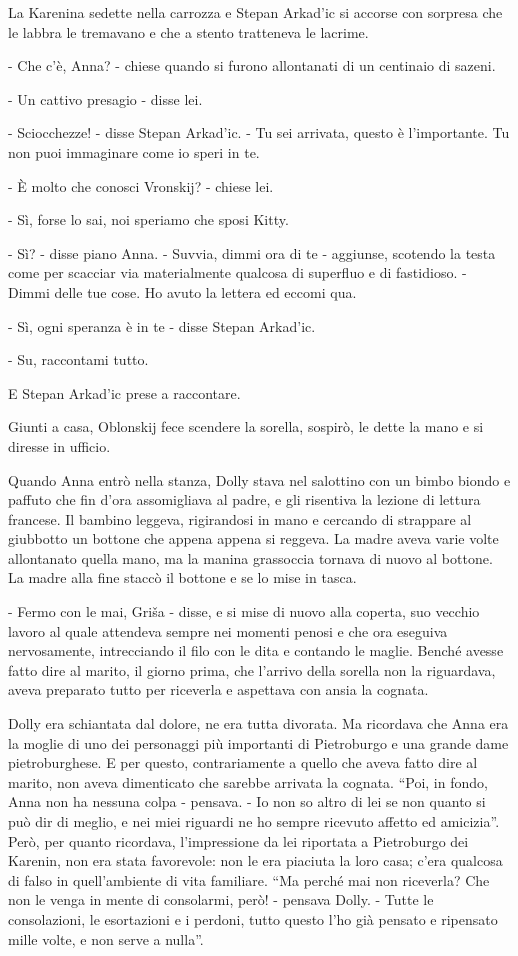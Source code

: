 La Karenina sedette nella carrozza e Stepan Arkad'ic si accorse con sorpresa che le labbra le tremavano e che a stento tratteneva le lacrime. 

- Che c'è, Anna? - chiese quando si furono allontanati di un centinaio di sazeni. 

- Un cattivo presagio - disse lei. 

- Sciocchezze! - disse Stepan Arkad'ic. - Tu sei arrivata, questo è l'importante. Tu non puoi immaginare come io speri in te. 

- È molto che conosci Vronskij? - chiese lei. 

- Sì, forse lo sai, noi speriamo che sposi Kitty. 

- Sì? - disse piano Anna. - Suvvia, dimmi ora di te - aggiunse, scotendo la testa come per scacciar via materialmente qualcosa di superfluo e di fastidioso. - Dimmi delle tue cose. Ho avuto la lettera ed eccomi qua. 

- Sì, ogni speranza è in te - disse Stepan Arkad'ic. 

- Su, raccontami tutto. 

E Stepan Arkad'ic prese a raccontare. 

Giunti a casa, Oblonskij fece scendere la sorella, sospirò, le dette la mano e si diresse in ufficio. 

\label{xix} 

Quando Anna entrò nella stanza, Dolly stava nel salottino con un bimbo biondo e paffuto che fin d'ora assomigliava al padre, e gli risentiva la lezione di lettura francese. Il bambino leggeva, rigirandosi in mano e cercando di strappare al giubbotto un bottone che appena appena si reggeva. La madre aveva varie volte allontanato quella mano, ma la manina grassoccia tornava di nuovo al bottone. La madre alla fine staccò il bottone e se lo mise in tasca. 

- Fermo con le mai, Griša - disse, e si mise di nuovo alla coperta, suo vecchio lavoro al quale attendeva sempre nei momenti penosi e che ora eseguiva nervosamente, intrecciando il filo con le dita e contando le maglie. Benché avesse fatto dire al marito, il giorno prima, che l'arrivo della sorella non la riguardava, aveva preparato tutto per riceverla e aspettava con ansia la cognata. 

Dolly era schiantata dal dolore, ne era tutta divorata. Ma ricordava che Anna era la moglie di uno dei personaggi più importanti di Pietroburgo e una grande dame pietroburghese. E per questo, contrariamente a quello che aveva fatto dire al marito, non aveva dimenticato che sarebbe arrivata la cognata. ``Poi, in fondo, Anna non ha nessuna colpa - pensava. - Io non so altro di lei se non quanto si può dir di meglio, e nei miei riguardi ne ho sempre ricevuto affetto ed amicizia''. Però, per quanto ricordava, l'impressione da lei riportata a Pietroburgo dei Karenin, non era stata favorevole: non le era piaciuta la loro casa; c'era qualcosa di falso in quell'ambiente di vita familiare. ``Ma perché mai non riceverla? Che non le venga in mente di consolarmi, però! - pensava Dolly. - Tutte le consolazioni, le esortazioni e i perdoni, tutto questo l'ho già pensato e ripensato mille volte, e non serve a nulla''. 

